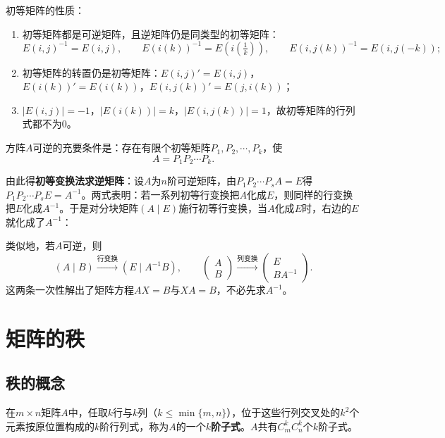 初等矩阵的性质：
\begin{enumerate}
\item 初等矩阵都是可逆矩阵，且逆矩阵仍是同类型的初等矩阵：
\[
E(i,j)^{-1}=E(i,j),\qquad E(i(k))^{-1}=E\left(i\left(\tfrac{1}{k}\right)\right),\qquad E(i,j(k))^{-1}=E(i,j(-k));
\]
\item 初等矩阵的转置仍是初等矩阵：$E(i,j)'=E(i,j)$，$E(i(k))'=E(i(k))$，$E(i,j(k))'=E(j,i(k))$；
\item $|E(i,j)|=-1$，$|E(i(k))|=k$，$|E(i,j(k))|=1$，故初等矩阵的行列式都不为$0$。
\end{enumerate}

\begin{theorem}
方阵$A$可逆的充要条件是：存在有限个初等矩阵$P_1,P_2,\cdots,P_k$，使
\[
A=P_1P_2\cdots P_k.
\]
\end{theorem}

由此得\textbf{初等变换法求逆矩阵}：设$A$为$n$阶可逆矩阵，由$P_1P_2\cdots P_sA=E$得$P_1P_2\cdots P_sE=A^{-1}$。两式表明：若一系列初等行变换把$A$化成$E$，则同样的行变换把$E$化成$A^{-1}$。于是对分块矩阵$(A\mid E)$施行初等行变换，当$A$化成$E$时，右边的$E$就化成了$A^{-1}$：


类似地，若$A$可逆，则
\[
(A\mid B)\xrightarrow{\text{行变换}}(E\mid A^{-1}B),\qquad
\begin{pmatrix}A\\B\end{pmatrix}\xrightarrow{\text{列变换}}\begin{pmatrix}E\\BA^{-1}\end{pmatrix}.
\]
这两条一次性解出了矩阵方程$AX=B$与$XA=B$，不必先求$A^{-1}$。


\section{矩阵的秩}

\subsection{秩的概念}

在$m\times n$矩阵$A$中，任取$k$行与$k$列（$k\le\min\{m,n\}$），位于这些行列交叉处的$k^2$个元素按原位置构成的$k$阶行列式，称为$A$的一个\textbf{$k$阶子式}。$A$共有$C_m^kC_n^k$个$k$阶子式。

